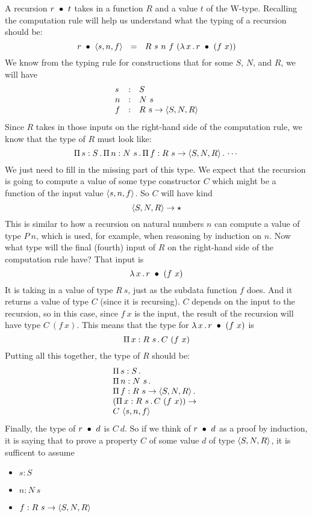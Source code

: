 \documentclass{article}
\begin{document}
A recursion $r\ \bullet\ t$ takes in a function $R$ and a value $t$ of the W-type.
Recalling the computation rule will help us understand what the typing of a recursion
should be:
\[
\wrec{r}{\ctor{s}{n}{f}} \ \ = \ \ R\ s\ n\ f\ (\lam{x}{\wrec{r}{(f\ x)}})
\]
\noindent We know from the typing rule for constructions that for some $S$, $N$, and $R$, we will have
\[
\begin{array}{lll}
  s & : & S \\
  n & : & N\ s \\
  f & : & R\ s \to \langle S , N , R \rangle
\end{array}
\]
\noindent Since $R$ takes in those inputs on the right-hand side of the computation rule,
we know that the type of $R$ must look like:
\[
\Pia{s}{S}{\Pia{n}{N\ s}{\Pia{f}{R\ s \to \w{S}{N}{R}}{\cdots}}}
\]
\noindent We just need to fill in the missing part of this type.  We expect that
the recursion is going to compute a value of some type constructor $C$ which might
be a function of the input value $\langle s , n, f \rangle$.  So $C$ will have kind
\[
\langle S , N , R \rangle \to \star
\]
\noindent This is similar to how a recursion on natural numbers $n$ can compute a value of type $P\ n$,
which is used, for example, when reasoning by induction on $n$.  Now what type will the final (fourth)
input of $R$ on the right-hand side of the computation rule have?  That input is
\[
\lambda\, x\, .\, r\ \bullet\ (f\ x)
\]
\noindent It is taking in a value of type $R\ s$, just as the subdata function $f$ does.  And it returns
a value of type $C$ (since it is recursing).  $C$ depends on the input to the recursion, so in this case,
since $f\ x$ is the input, the result of the recursion will have type $C\ (f\ x)$.  This means that the
type for $\lambda\, x\, .\, r\ \bullet\ (f\ x)$ is
\[
\Pi\, x: R\ s\, .\, C\ (f\ x)
\]
\noindent Putting all this together, the type of $R$ should be:
\[
\begin{array}{l}
  \Pi\, s: S\, .\, \ \\
  \Pi\, n: N\ s\, .\, \ \\
  \Pi\, f: R\ s \to \langle S , N , R \rangle\, .\, \  \\
  (\Pi\, x: R\ s\, .\, C\ (f\ x)) \to \\
  C\ \langle s , n, f \rangle
  \end{array}
\]
\noindent Finally, the type of $r\ \bullet\ d$ is $C\ d$.  So if we think of $r\ \bullet\ d$
as a proof by induction, it is saying that to prove a property $C$ of some value $d$ of
type $\langle S , N , R \rangle$, it is sufficent to assume

\begin{itemize}
\item $s : S$
\item $n : N\ s$
\item $f:R\ s \to \langle S , N , R \rangle$
\end{itemize}
\end{document}
